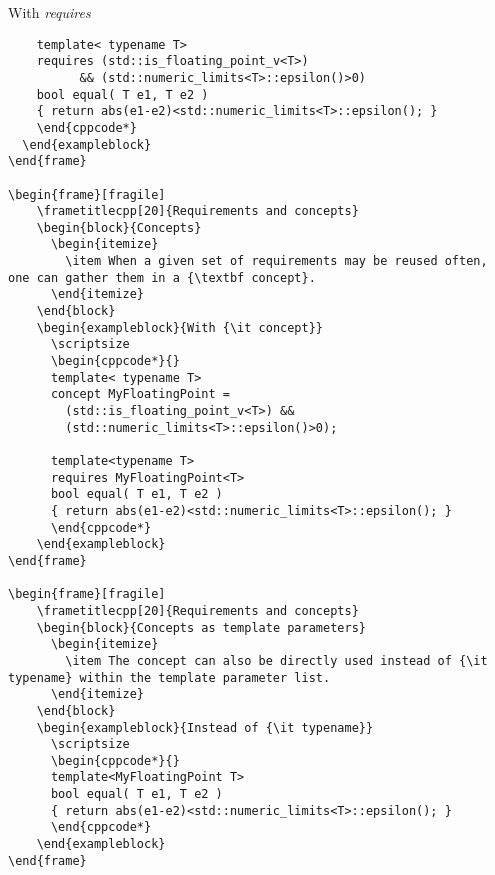 \begin{frame}[fragile]
\begin{exampleblock}{With {\it requires}}
\begin{verbatim}
    template< typename T>
    requires (std::is_floating_point_v<T>)
          && (std::numeric_limits<T>::epsilon()>0)
    bool equal( T e1, T e2 )
    { return abs(e1-e2)<std::numeric_limits<T>::epsilon(); }
    \end{cppcode*}
  \end{exampleblock}
\end{frame}

\begin{frame}[fragile]
    \frametitlecpp[20]{Requirements and concepts}
    \begin{block}{Concepts}
      \begin{itemize}
        \item When a given set of requirements may be reused often, one can gather them in a {\textbf concept}.
      \end{itemize}
    \end{block}
    \begin{exampleblock}{With {\it concept}}
      \scriptsize
      \begin{cppcode*}{}
      template< typename T>
      concept MyFloatingPoint =
        (std::is_floating_point_v<T>) &&
        (std::numeric_limits<T>::epsilon()>0);

      template<typename T>
      requires MyFloatingPoint<T>
      bool equal( T e1, T e2 )
      { return abs(e1-e2)<std::numeric_limits<T>::epsilon(); }
      \end{cppcode*}
    \end{exampleblock}
\end{frame}

\begin{frame}[fragile]
    \frametitlecpp[20]{Requirements and concepts}
    \begin{block}{Concepts as template parameters}
      \begin{itemize}
        \item The concept can also be directly used instead of {\it typename} within the template parameter list.
      \end{itemize}
    \end{block}
    \begin{exampleblock}{Instead of {\it typename}}
      \scriptsize
      \begin{cppcode*}{}
      template<MyFloatingPoint T>
      bool equal( T e1, T e2 )
      { return abs(e1-e2)<std::numeric_limits<T>::epsilon(); }
      \end{cppcode*}
    \end{exampleblock}
\end{frame}


\end{verbatim}
\end{exampleblock}
\end{frame}

